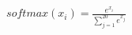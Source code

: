\documentclass[preview]{standalone}
\begin{document}
\begin{align*}
softmax(x_{i}) = \frac{e^{x_{i}}}{\sum_{j=1}^{20}e^{x_{j}}}
\end{align*}
\end{document}
